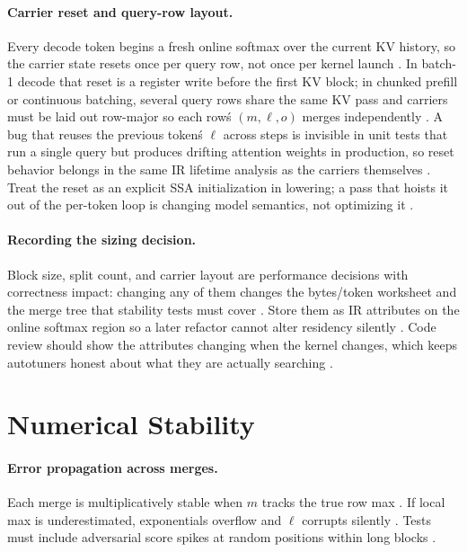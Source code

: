 \paragraph{Carrier reset and query-row layout.}
Every decode token begins a fresh online softmax over the current KV history, so the carrier state resets once per query row, not once per kernel launch \citep{dao2022flashattention,kwon2023vllm}. In batch-1 decode that reset is a register write before the first KV block; in chunked prefill or continuous batching, several query rows share the same KV pass and carriers must be laid out row-major so each row\'s $(m,\ell,o)$ merges independently \citep{dao2023flashdecoding,patel2025llminference}. A bug that reuses the previous token\'s $\ell$ across steps is invisible in unit tests that run a single query but produces drifting attention weights in production, so reset behavior belongs in the same IR lifetime analysis as the carriers themselves \citep{yirage2026,chen2020compilerbasedhardw}. Treat the reset as an explicit SSA initialization in lowering; a pass that hoists it out of the per-token loop is changing model semantics, not optimizing it \citep{memoryfloor2026}.

\paragraph{Recording the sizing decision.}
Block size, split count, and carrier layout are performance decisions with correctness impact: changing any of them changes the bytes/token worksheet and the merge tree that stability tests must cover \citep{taxbreak2026,yirage2026}. Store them as IR attributes on the online softmax region so a later refactor cannot alter residency silently \citep{chen2020compilerbasedhardw,memoryfloor2026}. Code review should show the attributes changing when the kernel changes, which keeps autotuners honest about what they are actually searching \citep{patel2025llminference}.


\section{Numerical Stability}
\label{sec:ch10_numerical_stability}
\paragraph{Error propagation across merges.} Each merge is multiplicatively stable when $m$ tracks the true row max \citep{dao2022flashattention,dlbook}. If local max is underestimated, exponentials overflow and $\ell$ corrupts silently \citep{patel2025llminference}. Tests must include adversarial score spikes at random positions within long blocks \citep{dao2023flashdecoding,yirage2026}.

